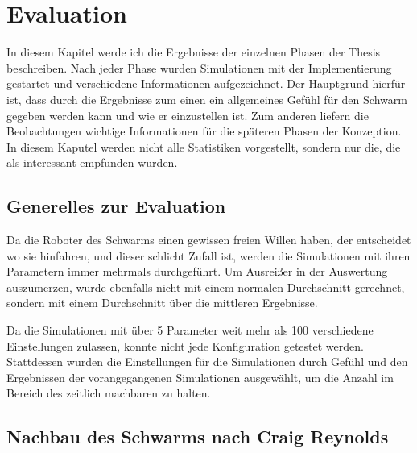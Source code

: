\chapter{Evaluation}\label{ch:Evaluation}

In diesem Kapitel werde ich die Ergebnisse der einzelnen Phasen der Thesis beschreiben. Nach jeder Phase wurden Simulationen mit der Implementierung gestartet und verschiedene Informationen aufgezeichnet. Der Hauptgrund hierfür ist, dass durch die Ergebnisse zum einen ein allgemeines Gefühl für den Schwarm gegeben werden kann und wie er einzustellen ist. Zum anderen liefern die Beobachtungen wichtige Informationen für die späteren Phasen der Konzeption.
In diesem Kaputel werden nicht alle Statistiken vorgestellt, sondern nur die, die als interessant empfunden wurden.

\section{Generelles zur Evaluation}

Da die Roboter des Schwarms einen gewissen freien Willen haben, der entscheidet wo sie hinfahren, und dieser schlicht Zufall ist, werden die Simulationen mit ihren Parametern immer mehrmals durchgeführt. Um Ausreißer in der Auswertung auszumerzen, wurde ebenfalls nicht mit einem normalen Durchschnitt gerechnet, sondern mit einem Durchschnitt über die mittleren Ergebnisse.

Da die Simulationen mit über 5 Parameter weit mehr als 100 verschiedene Einstellungen zulassen, konnte nicht jede Konfiguration getestet werden. Stattdessen wurden die Einstellungen für die Simulationen durch Gefühl und den Ergebnissen der vorangegangenen Simulationen ausgewählt, um die Anzahl im Bereich des zeitlich machbaren zu halten.

\section{Nachbau des Schwarms nach Craig Reynolds}

